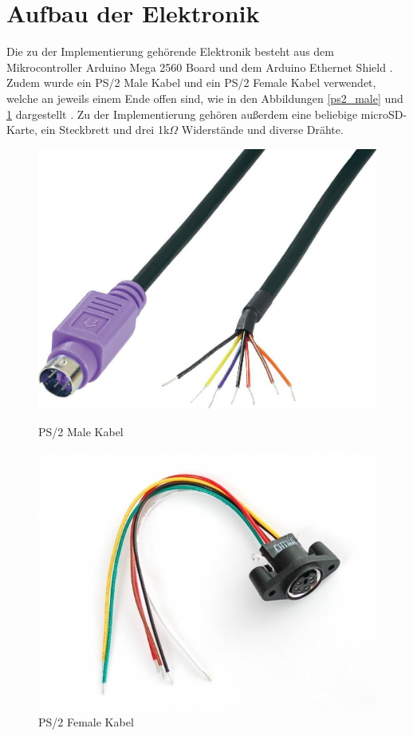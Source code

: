 \section{Aufbau der Elektronik}
Die zu der Implementierung gehörende Elektronik besteht aus dem Mikrocontroller Arduino Mega 2560 Board und dem Arduino Ethernet Shield \cite{arduino}. Zudem wurde ein PS/2 Male Kabel \cite{ps2male} und ein PS/2 Female Kabel \cite{ps2female} verwendet, welche an jeweils einem Ende offen sind, wie in den Abbildungen \ref{ps2_male} und \ref{ps2_female} dargestellt \cite{ps2_male} \cite{ps2_female}. Zu der Implementierung gehören außerdem eine beliebige microSD-Karte, ein Steckbrett und drei 1k$\Omega$ Widerstände und diverse Drähte.
\begin{figure}
  \centering
  \begin{minipage}{0.45\textwidth}
    \centering
    \includegraphics[width=1\textwidth]{images/ps2_male.jpg}
    \caption{PS/2 Male Kabel}
    \label{ps2_male}
  \end{minipage}
  \begin{minipage}{0.45\textwidth}
    \centering
    \includegraphics[width=1\textwidth]{images/ps2_female.jpg}
    \caption{PS/2 Female Kabel}
    \label{ps2_female}
  \end{minipage}
\end{figure}

